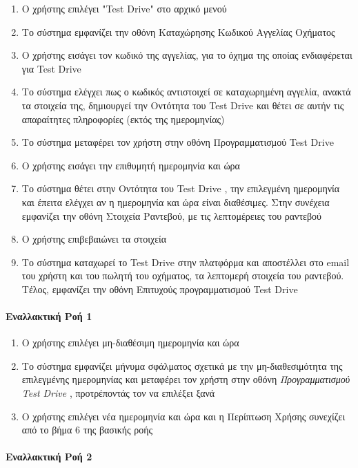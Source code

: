 \documentclass{../ol-softwaremanual}
\begin{document}
	\begin{enumerate}
		\item Ο χρήστης επιλέγει \en"Test Drive" \gr στο αρχικό μενού
		\item Το σύστημα εμφανίζει την οθόνη Καταχώρησης Κωδικού Αγγελίας Οχήματος
		\item Ο χρήστης εισάγει τον κωδικό της αγγελίας, για το όχημα της οποίας ενδιαφέρεται για \en Test Drive \gr
		\item Το σύστημα ελέγχει πως ο κωδικός αντιστοιχεί σε καταχωρημένη αγγελία, ανακτά τα στοιχεία της,  
		δημιουργεί την Οντότητα του \en Test Drive \gr και θέτει σε αυτήν τις απαραίτητες πληροφορίες (εκτός της ημερομηνίας)
		\item Το σύστημα μεταφέρει τον χρήστη στην οθόνη Προγραμματισμού \en Test Drive \gr 
		\item Ο χρήστης εισάγει την επιθυμητή ημερομηνία και ώρα		
		\item Το σύστημα θέτει στην Οντότητα του \en Test Drive \gr, την επιλεγμένη ημερομηνία και έπειτα ελέγχει αν η ημερομηνία και ώρα είναι διαθέσιμες. Στην συνέχεια εμφανίζει την οθόνη Στοιχεία Ραντεβού, με τις λεπτομέρειες του ραντεβού
		\item Ο χρήστης επιβεβαιώνει τα στοιχεία
		\item Το σύστημα καταχωρεί το \en Test Drive \gr στην πλατφόρμα και αποστέλλει στο \en email \gr του χρήστη και του πωλητή του οχήματος, τα λεπτομερή στοιχεία του ραντεβού. Τέλος, εμφανίζει την οθόνη Επιτυχούς προγραμματισμού \en Test Drive \gr 
	\end{enumerate}
	
	\paragraph{Εναλλακτική Ροή 1}
	
	\begin{enumerate}
		\item Ο χρήστης επιλέγει μη-διαθέσιμη ημερομηνία και ώρα
		\item Το σύστημα εμφανίζει μήνυμα σφάλματος σχετικά με την μη-διαθεσιμότητα της επιλεγμένης ημερομηνίας και μεταφέρει τον χρήστη στην οθόνη \textit{Προγραμματισμού \en Test Drive \gr}, προτρέποντάς τον να επιλέξει ξανά
		\item Ο χρήστης επιλέγει νέα ημερομηνία και ώρα και η Περίπτωση Χρήσης συνεχίζει από το βήμα 6 της βασικής ροής
	\end{enumerate}
	
	
	\paragraph{Εναλλακτική Ροή 2}
	
\end{document}
